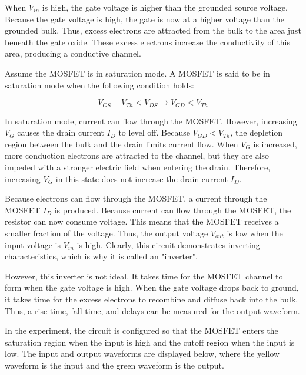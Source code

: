 When $V_{in}$ is high, the gate voltage is higher than the grounded source voltage. Because the gate voltage is high, the gate is now at a higher voltage than the grounded bulk. Thus, excess electrons are attracted from the bulk to the area just beneath the gate oxide. These excess electrons increase the conductivity of this area, producing a conductive channel.

Assume the MOSFET is in saturation mode. A MOSFET is said to be in saturation mode when the following condition holds:

\begin{equation}
	\label{eq:sat_mode}
	V_{GS} - V_{Th} < V_{DS} \rightarrow V_{GD} < V_{Th}
\end{equation}

In saturation mode, current can flow through the MOSFET. However, increasing $V_{G}$ causes the drain current $I_{D}$ to level off. Because $V_{GD} < V_{Th}$, the depletion region between the bulk and the drain limits current flow. When $V_{G}$ is increased, more conduction electrons are attracted to the channel, but they are also impeded with a stronger electric field when entering the drain. Therefore, increasing $V_{G}$ in this state does not increase the drain current $I_D$.

Because electrons can flow through the MOSFET, a current through the MOSFET $I_D$ is produced. Because current can flow through the MOSFET, the resistor can now consume voltage. This means that the MOSFET receives a smaller fraction of the voltage. Thus, the output voltage $V_{out}$ is low when the input voltage is $V_{in}$ is high. Clearly, this circuit demonstrates inverting characteristics, which is why it is called an "inverter".

However, this inverter is not ideal. It takes time for the MOSFET channel to form when the gate voltage is high. When the gate voltage drops back to ground, it takes time for the excess electrons to recombine and diffuse back into the bulk. Thus, a rise time, fall time, and delays can be measured for the output waveform. 

In the experiment, the circuit is configured so that the MOSFET enters the saturation region when the input is high and the cutoff region when the input is low. The input and output waveforms are displayed below, where the yellow waveform is the input and the green waveform is the output.

